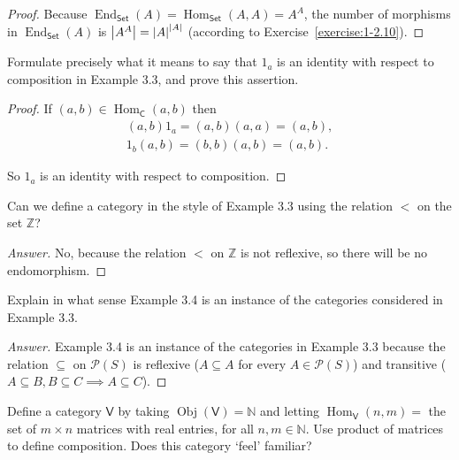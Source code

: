 \begin{proof}
	Because $\operatorname{End}_{\mathsf{Set}}(A) = \operatorname{Hom}_{\mathsf{Set}}(A, A) = A^{A}$, the number of morphisms in $\operatorname{End}_{\mathsf{Set}}(A)$ is $\left\vert{A^{A}}\right\vert = {\left\vert{A}\right\vert}^{\left\vert{A}\right\vert}$ (according to Exercise~\ref{exercise:1-2.10}).
\end{proof}

\begin{exercise}{3.3}
	Formulate precisely what it means to say that $1_{a}$ is an identity with respect to composition in Example 3.3, and prove this assertion.
\end{exercise}

\begin{proof}
	If $(a, b)\in \operatorname{Hom}_{\mathsf{C}}(a, b)$ then
	\begin{align*}
		(a, b)1_{a} = (a, b)(a, a) = (a, b), \\
		1_{b}(a, b) = (b, b)(a, b) = (a, b).
	\end{align*}

	So $1_{a}$ is an identity with respect to composition.
\end{proof}

\begin{exercise}{3.4}
	Can we define a category in the style of Example 3.3 using the relation $<$ on the set $\mathbb{Z}$?
\end{exercise}

\begin{proof}[Answer]
	No, because the relation $<$ on $\mathbb{Z}$ is not reflexive, so there will be no endomorphism.
\end{proof}

\begin{exercise}{3.5}
	Explain in what sense Example 3.4 is an instance of the categories considered in Example 3.3.
\end{exercise}

\begin{proof}[Answer]
	Example 3.4 is an instance of the categories in Example 3.3 because the relation $\subseteq$ on $\mathscr{P}(S)$ is reflexive ($A\subseteq A$ for every $A\in \mathscr{P}(S)$) and transitive ($A\subseteq B, B\subseteq C \implies A\subseteq C$).
\end{proof}

\begin{exercise}{3.6}
	Define a category $\mathsf{V}$ by taking $\operatorname{Obj}(\mathsf{V}) = \mathbb{N}$ and letting $\operatorname{Hom}_{\mathsf{V}}(n, m) =$ the set of $m\times n$ matrices with real entries, for all $n, m\in\mathbb{N}$. Use product of matrices to define composition. Does this category `feel' familiar?
\end{exercise}

